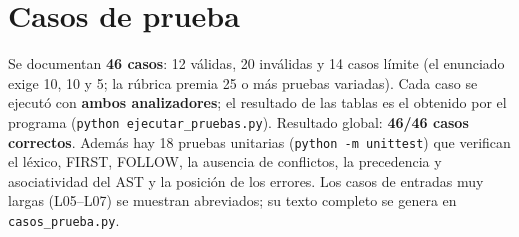 \fi
\ifnum{}

\section{Casos de prueba}

Se documentan \textbf{46 casos}: 12 válidas, 20 inválidas y 14 casos límite (el enunciado exige 10, 10 y 5; la rúbrica premia
25 o más pruebas variadas). Cada caso se ejecutó con \textbf{ambos analizadores}; el resultado de las tablas es el obtenido por el programa
(\texttt{python ejecutar\_pruebas.py}). Resultado global: \textbf{46/46 casos correctos}.
Además hay 18 pruebas unitarias (\texttt{python -m unittest}) que verifican el léxico, FIRST, FOLLOW, la ausencia de conflictos, la precedencia
y asociatividad del AST y la posición de los errores. Los casos de entradas muy largas (L05--L07) se muestran abreviados; su texto completo se genera
en \texttt{casos\_prueba.py}.

